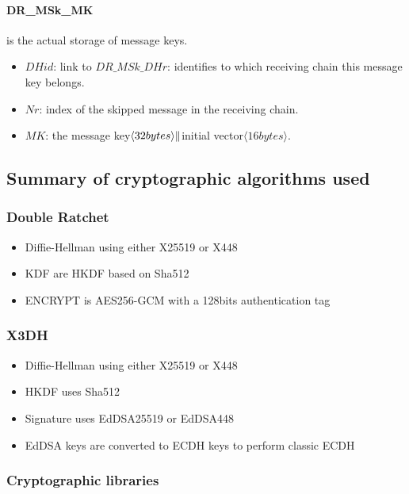\documentclass[a4paper,11pt]{article}
\begin{document}
    \paragraph*{DR\_MSk\_MK} is the actual storage of message keys.
    \begin{itemize}
      \item $DHid$: link to $DR\_MSk\_DHr$: identifies to which receiving chain this message key belongs.
      \item $Nr$: index of the skipped message in the receiving chain.
      \item $MK$: the message key$\langle 32bytes\rangle  \Arrowvert $initial vector$\langle 16bytes\rangle $.
    \end{itemize}
  

    
  \subsection{Summary of cryptographic algorithms used}
    \subsubsection{Double Ratchet}
      \begin{itemize}
        \item Diffie-Hellman using either X25519 or X448
        \item KDF are HKDF\cite{rfc5869} based on Sha512
        \item ENCRYPT is AES256-GCM with a 128bits authentication tag
      \end{itemize}
    \subsubsection{X3DH}
      \begin{itemize}
        \item Diffie-Hellman using either X25519 or X448
        \item HKDF uses Sha512
        \item Signature uses EdDSA25519 or EdDSA448
        \item EdDSA keys are converted to ECDH keys to perform classic ECDH
      \end{itemize}
  
  \subsubsection{Cryptographic libraries}
\end{document}
